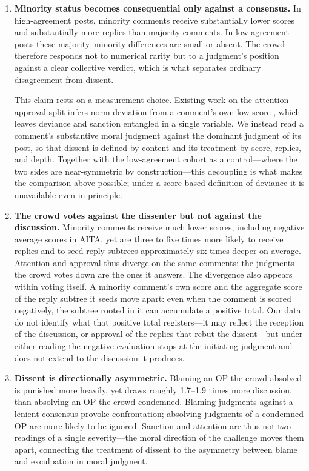 \begin{enumerate}
    \item \textbf{Minority status becomes consequential only against a consensus.} In high-agreement posts, minority comments receive substantially lower scores and substantially more replies than majority comments. In low-agreement posts these majority–minority differences are small or absent. The crowd therefore responds not to numerical rarity but to a judgment's position against a clear collective verdict, which is what separates ordinary disagreement from dissent.

    This claim rests on a measurement choice. Existing work on the attention–approval split infers norm deviation from a comment's own low score \cite{davis2021emotional}, which leaves deviance and sanction entangled in a single variable. We instead read a comment's substantive moral judgment against the dominant judgment of its post, so that dissent is defined by content and its treatment by score, replies, and depth. Together with the low-agreement cohort as a control—where the two sides are near-symmetric by construction—this decoupling is what makes the comparison above possible; under a score-based definition of deviance it is unavailable even in principle.

    \item \textbf{The crowd votes against the dissenter but not against the discussion.} Minority comments receive much lower scores, including negative average scores in AITA, yet are three to five times more likely to receive replies and to seed reply subtrees approximately six times deeper on average. Attention and approval thus diverge on the same comments: the judgments the crowd votes down are the ones it answers. The divergence also appears within voting itself. A minority comment's own score and the aggregate score of the reply subtree it seeds move apart: even when the comment is scored negatively, the subtree rooted in it can accumulate a positive total. Our data do not identify what that positive total registers—it may reflect the reception of the discussion, or approval of the replies that rebut the dissent—but under either reading the negative evaluation stops at the initiating judgment and does not extend to the discussion it produces.

    \item \textbf{Dissent is directionally asymmetric.} Blaming an OP the crowd absolved is punished more heavily, yet draws roughly 1.7–1.9 times more discussion, than absolving an OP the crowd condemned. Blaming judgments against a lenient consensus provoke confrontation; absolving judgments of a condemned OP are more likely to be ignored. Sanction and attention are thus not two readings of a single severity—the moral direction of the challenge moves them apart, connecting the treatment of dissent to the asymmetry between blame and exculpation in moral judgment.


\end{enumerate}
